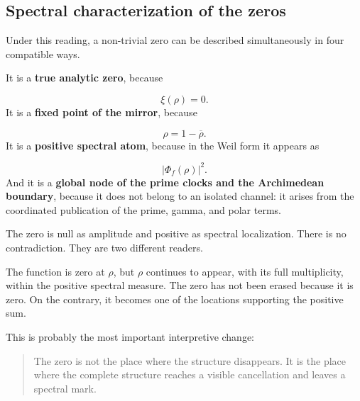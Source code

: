 \subsection{Spectral characterization of the zeros}
Under this reading, a non-trivial zero can be described simultaneously in four compatible ways.\par
It is a \textbf{true analytic zero}, because\par
\[
\xi(\rho)=0.
\]
It is a \textbf{fixed point of the mirror}, because\par
\[
\rho=1-\overline\rho.
\]
It is a \textbf{positive spectral atom}, because in the Weil form it appears as\par
\[
|\Phi_f(\rho)|^2.
\]
And it is a \textbf{global node of the prime clocks and the Archimedean boundary}, because it does not belong to an isolated channel: it arises from the coordinated publication of the prime, gamma, and polar terms.\par
The zero is null as amplitude and positive as spectral localization. There is no contradiction. They are two different readers.\par
The function is zero at \(\rho\), but \(\rho\) continues to appear, with its full multiplicity, within the positive spectral measure. The zero has not been erased because it is zero. On the contrary, it becomes one of the locations supporting the positive sum.\par
This is probably the most important interpretive change:\par
\begin{quote}
The zero is not the place where the structure disappears. It is the place where the complete structure reaches a visible cancellation and leaves a spectral mark.\par
\end{quote}
